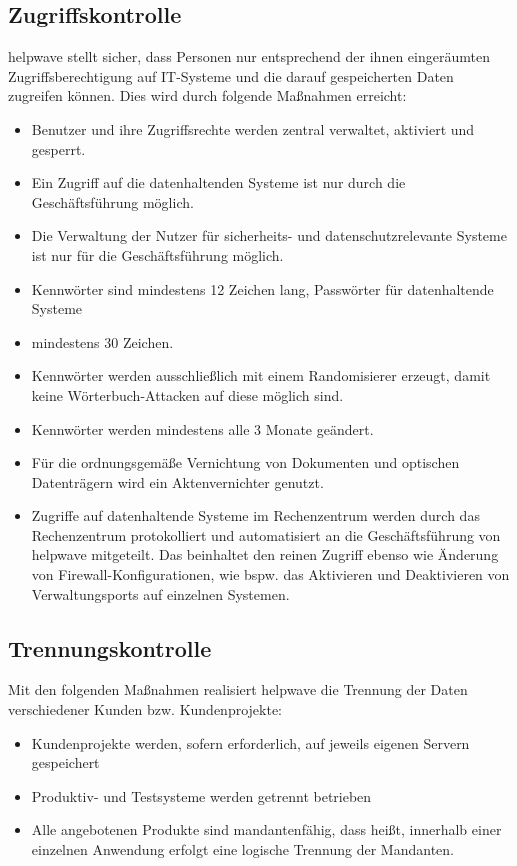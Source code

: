\documentclass[10pt]{article}
\begin{document}
\subsection{Zugriffskontrolle}
helpwave stellt sicher, dass Personen nur entsprechend der ihnen eingeräumten
Zugriffsberechtigung auf IT-Systeme und die darauf gespeicherten Daten zugreifen können.
Dies wird durch folgende Maßnahmen erreicht:
\begin{itemize}
	\item Benutzer und ihre Zugriffsrechte werden zentral verwaltet, aktiviert und gesperrt.
	\item Ein Zugriff auf die datenhaltenden Systeme ist nur durch die Geschäftsführung möglich.
	\item Die Verwaltung der Nutzer für sicherheits- und datenschutzrelevante Systeme ist nur für die Geschäftsführung möglich.
	\item Kennwörter sind mindestens 12 Zeichen lang, Passwörter für datenhaltende Systeme
	\item mindestens 30 Zeichen.
	\item Kennwörter werden ausschließlich mit einem Randomisierer erzeugt, damit keine Wörterbuch-Attacken auf diese möglich sind.
	\item Kennwörter werden mindestens alle 3 Monate geändert.
	\item Für die ordnungsgemäße Vernichtung von Dokumenten und optischen Datenträgern wird ein Aktenvernichter genutzt.
	\item Zugriffe auf datenhaltende Systeme im Rechenzentrum werden durch das
	      Rechenzentrum protokolliert und automatisiert an die Geschäftsführung von
	      helpwave mitgeteilt. Das beinhaltet den reinen Zugriff ebenso wie Änderung von
	      Firewall-Konfigurationen, wie bspw. das Aktivieren und Deaktivieren von
	      Verwaltungsports auf einzelnen Systemen.
\end{itemize}
\subsection{Trennungskontrolle}
Mit den folgenden Maßnahmen realisiert helpwave die Trennung der Daten verschiedener Kunden bzw. Kundenprojekte:
\begin{itemize}
	\item Kundenprojekte werden, sofern erforderlich, auf jeweils eigenen Servern gespeichert
	\item Produktiv- und Testsysteme werden getrennt betrieben
	\item Alle angebotenen Produkte sind mandantenfähig, dass heißt, innerhalb einer einzelnen Anwendung erfolgt eine logische Trennung der Mandanten.
\end{itemize}
\end{document}
